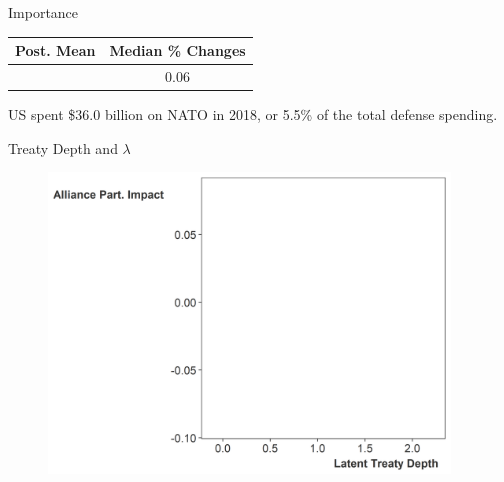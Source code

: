 \documentclass[12pt]{beamer}
\begin{document}

\begin{frame}[standout]{Importance} 

\begin{tabular}{cc}
 Post. Mean & Median \% Changes \\
\hline
\pause
 0.02 & 0.06  \\
\end{tabular}

\pause

US spent \$36.0 billion on NATO in 2018, or 5.5\% of the total defense spending. 


\end{frame}



\begin{frame}{Treaty Depth and $\lambda$}

\begin{figure}[htbp]
	\centering
		\includegraphics[width=0.95\textwidth]{ld-lambda-blank.png}
	\label{fig:ld-lambda-blank}
\end{figure}


\end{frame}


\end{document}

